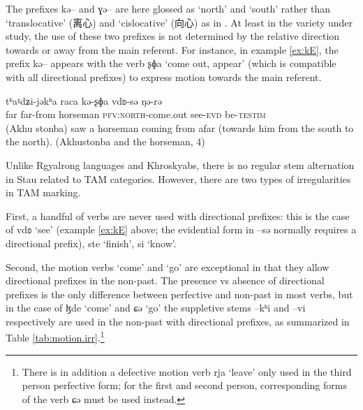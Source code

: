 \documentclass[oldfontcommands,twoside,12pt]{memoir}
\newcommand{\ipa}[1]{{\phon #1}} %
\newcommand{\zh}[1]{{\cn #1}}
\begin{document}
The prefixes \ipa{kə--} and \ipa{ɣə--} are here glossed as `north' and `south' rather than `translocative' (\zh{离心}) and  `cislocative' (\zh{向心}) as in \citet[26]{huangbf91daofu}. At least in the variety under study, the  use of these two prefixes is not determined by the relative direction towards or away from the main referent. For instance, in example \ref{ex:kE},   the prefix \ipa{kə--} appears with  the verb \ipa{ʂɸa} `come out, appear' (which is compatible with all directional prefixes) to express motion towards the main referent.

\begin{exe}
\ex \label{ex:kE}
\gll 	\ipa{tʰaˠdʑi}  	\ipa{tʰaˠdʑi-jəkʰa}  	\ipa{raca}  	\ipa{kə-ʂɸa}  	\ipa{vdʚ-sə}  	\ipa{ŋə-rə}  \\
far far-from horseman \textsc{pfv:north}-come.out see-\textsc{evd} be-\textsc{testim} \\
\glt (Akhu stonba) saw  a horseman coming from afar (towards him from the south to the north). (Akhustonba and the horseman, 4)
\end{exe}


Unlike Rgyalrong languages and Khroskyabs, there is no regular stem alternation in Stau related to TAM categories. However, there are two types of irregularities in TAM marking.

First, a handful of verbs are never used with directional prefixes: this is the case of \ipa{vdʚ} `see' (example \ref{ex:kE} above; the evidential form in --\ipa{sə} normally requires a directional prefix), \ipa{ste} `finish', \ipa{si} `know'.

Second, the motion verbs `come' and `go' are exceptional in that they allow directional prefixes in the non-past. The presence vs absence of directional prefixes is the only difference between perfective and non-past in most verbs, but in the case of \ipa{ɮde} `come' and \ipa{ɕə} `go' the suppletive stems  \ipa{--kʰi} and \ipa{--vi} respectively are used in the non-past with directional prefixes, as summarized in Table \ref{tab:motion.irr}.\footnote{There is in addition a defective motion verb \ipa{rja} `leave' only used in the third person perfective form; for the first and second person, corresponding forms of the verb \ipa{ɕə} must be used instead.}
\end{document}
